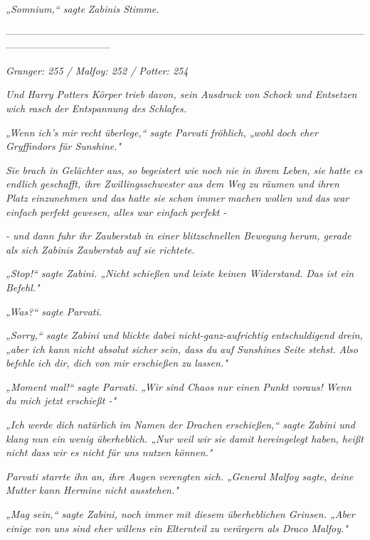 {\emph{„\emph{Somnium,}“ sagte} \emph{Zabinis Stimme.}

--------------------------------------------------------------------------------------------------------------------------------------------

\hfill\break \emph{Granger: 255 / Malfoy: 252 / Potter: 254}

\emph{Und Harry Potters Körper} \emph{trieb} \emph{davon, sein Ausdruck} \emph{von} \emph{Schock und Entsetzen wich} \emph{rasch} \emph{der Entspannung des Schlafes.}

\emph{„Wenn ich's mir} \emph{recht} \emph{überlege,“ sagte Parvati fröhlich, „wohl doch eher Gryffindors für Sunshine."}

\emph{Sie brach in Gelächter aus, so begeistert wie noch nie in ihrem Leben, sie hatte es} \emph{\emph{endlich}} \emph{geschafft, ihre Zwillingsschwester aus dem Weg zu räumen und ihren Platz einzunehmen und das hatte sie schon} \emph{\emph{immer}} \emph{machen wollen und} \emph{das war einfach} \emph{\emph{perfekt}} \emph{gewesen, alles war einfach} \emph{\emph{perfekt}} \emph{-}

\emph{- und dann fuhr ihr Zauberstab in einer blitzschnellen Bewegung herum, gerade als sich Zabinis Zauberstab auf sie richtete.}

\emph{„Stop!“ sagte Zabini. „Nicht schießen} \emph{und leiste keinen Widerstand. Das ist ein Befehl."}

\emph{„\emph{Was?}“ sagte Parvati.}

\emph{„Sorry,“ sagte Zabini und blickte dabei nicht-ganz-aufrichtig} \emph{entschuldigend drein, „aber ich kann nicht absolut} \emph{\emph{sicher}} \emph{sein, dass du} \emph{auf Sunshines Seite stehst.} \emph{Also befehle ich dir, dich von mir erschießen zu lassen."}

\emph{„\emph{Moment mal!}“ sagte Parvati. „Wir sind Chaos nur einen Punkt voraus! Wenn du mich jetzt erschießt -"}

\emph{„Ich werde dich} \emph{\emph{natürlich}} \emph{im Namen der Drachen erschießen,“ sagte Zabini und klang nun ein wenig überheblich. „Nur weil wir} \emph{\emph{sie}} \emph{damit hereingelegt haben, heißt nicht dass} \emph{wir es nicht für uns nutzen können."}

\emph{Parvati starrte ihn an, ihre Augen verengten sich. „General Malfoy sagte, deine Mutter kann Hermine nicht ausstehen."}

\emph{„Mag sein,“ sagte Zabini, noch immer mit diesem überheblichen Grinsen. „Aber einige von uns sind eher willens ein Elternteil zu verärgern als Draco Malfoy."}

}
